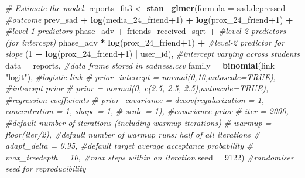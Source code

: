 \documentclass[doc]{apa6}
\newenvironment{Shaded}{\begin{snugshade}}{\end{snugshade}}
\newcommand{\KeywordTok}[1]{\textcolor[rgb]{0.13,0.29,0.53}{\textbf{#1}}}
\newcommand{\DataTypeTok}[1]{\textcolor[rgb]{0.13,0.29,0.53}{#1}}
\newcommand{\DecValTok}[1]{\textcolor[rgb]{0.00,0.00,0.81}{#1}}
\newcommand{\StringTok}[1]{\textcolor[rgb]{0.31,0.60,0.02}{#1}}
\newcommand{\CommentTok}[1]{\textcolor[rgb]{0.56,0.35,0.01}{\textit{#1}}}
\newcommand{\OperatorTok}[1]{\textcolor[rgb]{0.81,0.36,0.00}{\textbf{#1}}}
\newcommand{\NormalTok}[1]{#1}
\begin{document}
\begin{Shaded}
\begin{Highlighting}[]
\CommentTok{# Estimate the model.}
\NormalTok{reports_fit3 <-}\StringTok{ }\KeywordTok{stan_glmer}\NormalTok{(}\DataTypeTok{formula =}\NormalTok{ sad.depressed }\OperatorTok{~}\StringTok{  }\CommentTok{#outcome}
\StringTok{  }\NormalTok{prev_sad }\OperatorTok{+}\StringTok{ }\KeywordTok{log}\NormalTok{(media_24_friend}\OperatorTok{+}\DecValTok{1}\NormalTok{) }\OperatorTok{+}\StringTok{ }\KeywordTok{log}\NormalTok{(prox_24_friend}\OperatorTok{+}\DecValTok{1}\NormalTok{) }\OperatorTok{+}\StringTok{ }\CommentTok{#level-1 predictors}
\StringTok{  }\NormalTok{phase_adv }\OperatorTok{+}\StringTok{ }\NormalTok{friends_received_sqrt }\OperatorTok{+}\StringTok{ }\CommentTok{#level-2 predictors (for intercept)}
\StringTok{  }\NormalTok{phase_adv }\OperatorTok{*}\StringTok{ }\KeywordTok{log}\NormalTok{(prox_24_friend}\OperatorTok{+}\DecValTok{1}\NormalTok{) }\OperatorTok{+}\StringTok{ }\CommentTok{#level-2 predictor for slope}
\StringTok{  }\NormalTok{(}\DecValTok{1} \OperatorTok{+}\StringTok{ }\KeywordTok{log}\NormalTok{(prox_24_friend}\OperatorTok{+}\DecValTok{1}\NormalTok{) }\OperatorTok{|}\StringTok{ }\NormalTok{user_id), }\CommentTok{#intercept varying across students}
  \DataTypeTok{data =}\NormalTok{ reports, }\CommentTok{#data frame stored in sadness.csv}
  \DataTypeTok{family =} \KeywordTok{binomial}\NormalTok{(}\DataTypeTok{link =} \StringTok{"logit"}\NormalTok{), }\CommentTok{#logistic link}
  \CommentTok{# prior_intercept = normal(0,10,autoscale=TRUE), #intercept prior}
  \CommentTok{# prior = normal(0, c(2.5, 2.5, 2.5),autoscale=TRUE), #regression coefficients}
  \CommentTok{# prior_covariance = decov(regularization = 1, concentration = 1, shape = 1,}
  \CommentTok{# scale = 1), #covariance prior}
  \CommentTok{# iter = 2000, #default number of iterations (including warmup iterations)}
  \CommentTok{# warmup = floor(iter/2), #default number of warmup runs: half of all iterations}
  \CommentTok{# adapt_delta = 0.95, #default target average acceptance probability}
  \CommentTok{# max_treedepth = 10, #max steps within an iteration}
  \DataTypeTok{seed =} \DecValTok{9122}\NormalTok{) }\CommentTok{#randomiser seed for reproducibility}
\end{Highlighting}
\end{Shaded}
\end{document}
